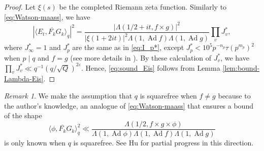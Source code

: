 \documentclass[12pt,reqno]{amsart}
\theoremstyle{remark}
\newtheorem*{rek}{Remark}
\DeclareMathOperator{\ad}{Ad}
\numberwithin{equation}{section}
\begin{document}
\begin{proof}
		 Let $\xi(s)$ be the completed Riemann zeta function. Similarly to \eqref{eq:Watson-maass}, we have
    \begin{equation}\label{eq:watson-cor-2}
			|\langle E_t, \overline{F_k}G_k \rangle_q|^2 =  \frac{|\Lambda(1/2+it, f\times g)|^2}{|\xi(1+2it)|^2\Lambda(1,\ad f)\Lambda(1,\ad g)}\prod_v J_v^*, 
		\end{equation}
     where $J_\infty^* = 1$ and $J_p^*$ are the same as in \eqref{eq:I_p*}, except $J_p^* < 10^5p^{-n_p}\tau(p^{m_p})^2$ when $p \mid q$ and $f=g$ (see more details in \cite[Remark 3.2]{NPS}). By these calculation of $J_v^*$, we have $\prod_v J_v^* \ll q^{-1}({q}/{\sqrt{Q}})^{2\varepsilon}$. Hence, \eqref{eq:sound_Eis} follows from Lemma \ref{lem:bound-Lambda-Eis}.
    \end{proof}
    \begin{rek}    
     We make the assumption that $q$ is squarefree when $f \neq g$ because to the author's knowledge, an analogue of \eqref{eq:Watson-maass} that ensures a bound of the shape 
    \[
        \langle \phi, \overline{F_k}G_k \rangle_q^2 \ll \frac{\Lambda(1/2, f \times g \times \phi)}{\Lambda(1, \ad \phi)\Lambda(1,\ad f)\Lambda(1,\ad g)}
    \]
    is only known when $q$ is squarefree.  See Hu \cite[Section 3]{YH} for partial progress in this direction. 
    \end{rek}
  
\end{document}
